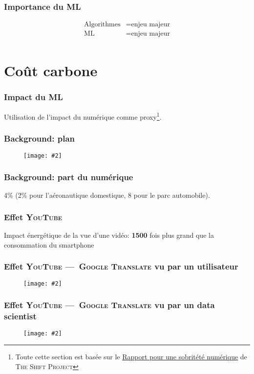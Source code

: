 \documentclass[10pt]{beamer}
\newcommand{\imgtw}[2][1]{%
  \begin{figure}%
    \centering%
    \texttt{[image: \#2]}%
  \end{figure}%
}
\newcommand{\imgth}[2][1]{%
  \begin{figure}%
    \centering%
    \texttt{[image: \#2]}%
  \end{figure}%
}
\begin{document}
\begin{frame}
  \frametitle{Importance du ML}
  \begin{align*}
    \text{Algorithmes} & = \text{enjeu majeur}      \\
    \text{ML}          & = \text{enjeu majeur} \\
  \end{align*}
\end{frame}

\section{Coût carbone}
\label{sec:cout-carbone}

\begin{frame}
  \frametitle{Impact du ML}
  Utilisation de l'impact du numérique comme proxy\footnote{Toute
    cette section est basée sur le \href{https://theshiftproject.org%
      /wp-content/uploads/2018/10%
      /2018-10-04_Rapport_Pour-une-sobri\%C3\%A9t\%C3\%A9%
      -num\%C3\%A9rique_Rapport_The-Shift-Project.pdf}%
    {Rapport pour une sobritété numérique} de \textsc{The Shift
      Project}}.
\end{frame}

\begin{frame}
  \frametitle{Background: plan}
  \imgtw{plan}
\end{frame}

\begin{frame}
  \frametitle{Background: part du numérique}
  4\% (2\% pour l'aéronautique domestique, 8 pour le parc automobile).
\end{frame}

\begin{frame}
  \frametitle{Effet \textsc{YouTube}}

  Impact énergétique de la vue d'une vidéo: \textbf{1500} fois plus grand que la
  consommation du smartphone
\end{frame}

\begin{frame} 
  \frametitle{Effet \textsc{YouTube} ---~\textsc{Google Translate} vu
    par un utilisateur}

  \imgth[.9]{translate-mobile}
\end{frame}

\begin{frame}
  \frametitle{Effet \textsc{YouTube} ---~\textsc{Google Translate} vu
    par un data scientist}

  \imgtw{datascientist-view}
\end{frame}
\end{document}
